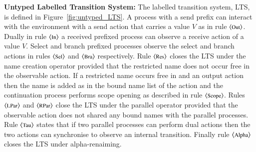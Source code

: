 {\bf Untyped Labelled Transition System:}
The labelled transition system, LTS, is defined in Figure~\ref{fig:untyped_LTS}.
A process with a send prefix can interact with the environment with a send
action that carries a value $V$ as in rule ${\footnotesize \langle \textrm{Out} \rangle}$.
Dually in rule ${\footnotesize \langle \textrm{In} \rangle}$
a received prefixed process can observe a receive action of a value $V$.
Select and branch prefixed processes observe the select
and branch actions in rules ${\footnotesize \langle \textrm{Sel} \rangle}$ and ${\footnotesize \langle \textrm{Bra} \rangle}$ respectively.
Rule ${\footnotesize \langle \textrm{Res} \rangle}$ closes the LTS under the name creation
operator provided that the restricted name does not occur free in the observable action.
If a restricted name occurs free in and an output action 
then the name is added as in the bound name list of the action
and the continuation process performs scope opening as described in rule ${\footnotesize \langle \textrm{Scope} \rangle}$.
Rules ${\footnotesize \langle \textrm{LPar} \rangle}$ and ${\footnotesize \langle \textrm{RPar} \rangle}$ close the LTS under the parallel operator 
provided that the observable action does not shared any bound names with the 
parallel processes.
Rule ${\footnotesize \langle \textrm{Tau} \rangle}$ states that if two parallel processes can perform dual actions
then the two actions  can synchronise to observe an internal transition. 
Finally rule ${\footnotesize \langle \textrm{Alpha} \rangle}$ closes  the LTS under alpha-renaiming.

